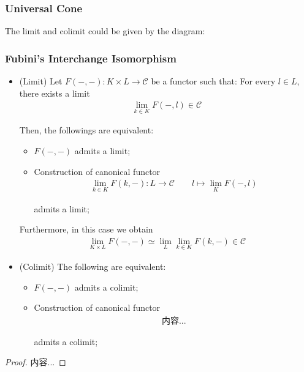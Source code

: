 \documentclass[Total.tex]{subfiles}
\begin{document}
				\subsubsection{Universal Cone}
					The limit and colimit could be given by the diagram:
					\begin{center}
					\end{center}
				\subsubsection{Fubini's Interchange Isomorphism}
					\begin{proposition}
						\begin{itemize}
							\item (Limit) Let $F(-,-):K\times L\rightarrow \mathcal{C}$ be a functor such that: For every $l\in L$, there exists a limit
							\begin{gather*}
								\lim_{k\in K} F(-,l)\in \mathcal{C}
							\end{gather*}
							
							Then, the followings are equivalent:
							\begin{itemize}
								\item $F(-,-)$ admits a limit;
								\item Construction of canonical functor
								\begin{gather*}
									\lim_{k\in K} F(k,-):L\rightarrow \mathcal{C}\qquad l\mapsto \lim_K F(-,l)
								\end{gather*}
								
								admits a limit;
							\end{itemize}
							
							Furthermore, in this case we obtain
							\begin{gather*}
								\lim_{K\times L} F(-,-)\simeq \lim_L \lim_{k\in K} F(k,-)\in \mathcal{C}
							\end{gather*}
							\item (Colimit) The following are equivalent:
							\begin{itemize}
								\item $F(-,-)$ admits a colimit;
								\item Construction of canonical functor
								\begin{gather*}
									内容...
								\end{gather*}
								
								admits a colimit;
							\end{itemize}
						\end{itemize}
					\end{proposition}
					\begin{proof}
						内容...
					\end{proof}
					
\end{document}
